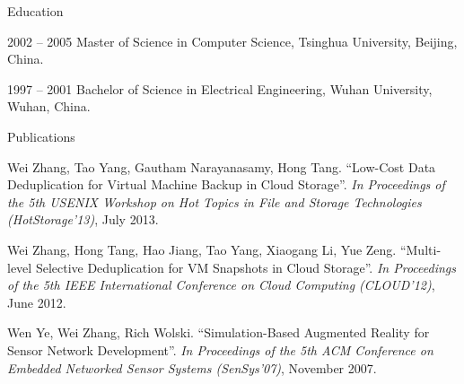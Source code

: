 \begin{vitae}
{\small

\begin{vitaesection}{Education}
\vspace{-0.1cm}
   \item [2002 -- 2005] Master of Science in Computer Science, Tsinghua University, Beijing, China.
    
   \item [1997 -- 2001] Bachelor of Science in Electrical Engineering, Wuhan University, Wuhan, China.

\end{vitaesection}



\begin{vitaesection}{Publications}


\item Wei Zhang, Tao Yang, Gautham Narayanasamy, Hong Tang. ``Low-Cost Data Deduplication for Virtual Machine Backup in Cloud Storage''. {\it In Proceedings of the 5th USENIX Workshop on Hot Topics in File and Storage Technologies (HotStorage'13)}, July 2013.

\item Wei Zhang, Hong Tang, Hao Jiang, Tao Yang, Xiaogang Li, Yue Zeng. ``Multi-level Selective Deduplication for VM Snapshots in Cloud Storage''. {\it In Proceedings of the 5th IEEE International Conference on Cloud Computing (CLOUD'12)}, June 2012.

\item Wen Ye, Wei Zhang, Rich Wolski. ``Simulation-Based Augmented Reality for Sensor Network Development''. {\it In Proceedings of the 5th ACM Conference on Embedded Networked Sensor Systems (SenSys'07)}, November 2007.


\end{vitaesection}}
\end{vitae}
